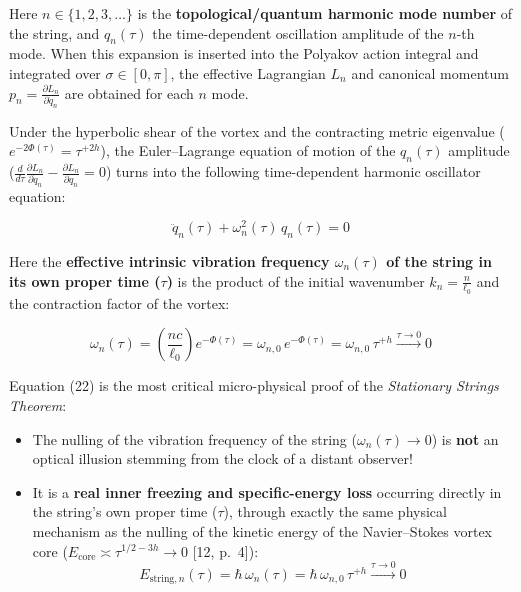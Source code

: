 \documentclass[12pt,a4paper]{article}
\begin{document}
Here $n \in \{1, 2, 3, \dots\}$ is the \textbf{topological/quantum harmonic mode number} of the string, and $q_n(\tau)$ the time-dependent oscillation amplitude of the $n$-th mode. When this expansion is inserted into the Polyakov action integral and integrated over $\sigma \in [0, \pi]$, the effective Lagrangian $L_n$ and canonical momentum $p_n = \frac{\partial L_n}{\partial \dot{q}_n}$ are obtained for each $n$ mode.

Under the hyperbolic shear of the vortex and the contracting metric eigenvalue ($e^{-2\Phi(\tau)} = \tau^{+2h}$), the Euler--Lagrange equation of motion of the $q_n(\tau)$ amplitude ($\frac{d}{d\tau}\frac{\partial L_n}{\partial \dot{q}_n} - \frac{\partial L_n}{\partial q_n} = 0$) turns into the following time-dependent harmonic oscillator equation:

\begin{equation}
\ddot{q}_n(\tau) + \omega_n^2(\tau) \, q_n(\tau) = 0
\end{equation}

Here the \textbf{effective intrinsic vibration frequency $\omega_n(\tau)$ of the string in its own proper time ($\tau$)} is the product of the initial wavenumber $k_n = \frac{n}{\ell_0}$ and the contraction factor of the vortex:

\begin{equation}
\omega_n(\tau) = \left( \frac{n c}{\ell_0} \right) e^{-\Phi(\tau)} = \omega_{n,0} \, e^{-\Phi(\tau)} = \omega_{n,0} \, \tau^{+h} \xrightarrow{\tau \to 0} 0
\end{equation}

Equation (22) is the most critical micro-physical proof of the \textit{Stationary Strings Theorem}:
\begin{itemize}
    \item The nulling of the vibration frequency of the string ($\omega_n(\tau) \to 0$) is \textbf{not} an optical illusion stemming from the clock of a distant observer!
    \item It is a \textbf{real inner freezing and specific-energy loss} occurring directly in the string's own proper time ($\tau$), through exactly the same physical mechanism as the nulling of the kinetic energy of the Navier--Stokes vortex core ($E_{\text{core}} \asymp \tau^{1/2-3h} \to 0$ [12, p.\ 4]):
    \begin{equation}
    E_{\text{string}, n}(\tau) = \hbar \, \omega_n(\tau) = \hbar \, \omega_{n,0} \, \tau^{+h} \xrightarrow{\tau \to 0} 0
    \end{equation}
\end{itemize}
\end{document}
